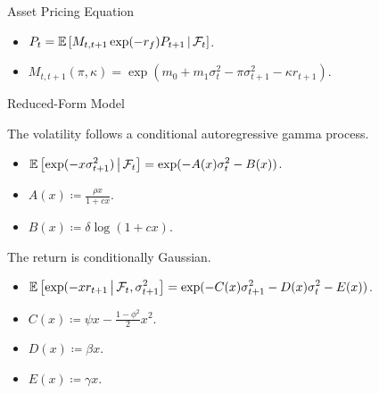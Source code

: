 \documentclass[smaller, aspectratio=169]{beamer}
\begin{document}
\begin{frame}[c]{Asset Pricing Equation}

  \begin{itemize}
    \item $\displaystyle P_t = \mathbb{E}\left[M_{t, t+1} \exp(-r_f) P_{t+1} \,\middle\vert\, \mathcal{F}_{t} \right]$.
      \bigskip
%
    \item $\displaystyle M_{t, t+1}(\pi, \kappa) = \exp\left(m_0 + m_1 \sigma^2_t - \pi \sigma^2_{t+1} - \kappa r_{t+1}\right)$.
  \end{itemize}

\end{frame}


\begin{frame}[c]{Reduced-Form Model}

  The volatility follows a conditional autoregressive gamma process.
%
  \medskip
  \begin{itemize}
    \item $\displaystyle \mathbb{E}\left[\exp(-x \sigma^2_{t+1}) \,\middle\vert\, \mathcal{F}_t\right] = \exp(-A(x) \sigma^2_{t} - B(x)) $.
    \medskip
%
    \item $\displaystyle A(x) \coloneqq \frac{\rho x}{1 + c x}$.
    \medskip
%
    \item $\displaystyle B(x) \coloneqq \delta \log(1 + c x)$.
  \end{itemize}
 
  \bigskip
  The return is conditionally Gaussian.
  \medskip

  \begin{itemize}
    \item $\displaystyle \mathbb{E}\left[\exp(-x r_{t+1} \,\middle\vert\, \mathcal{F}_t, \sigma^2_{t+1} \right] = \exp(-C(x) \sigma^2_{t+1} - D(x) \sigma^2_t - E(x))$.
    \medskip
%
    \item $\displaystyle C(x) \coloneqq \psi x - \frac{1-\phi^2}{2} x^2 $.
    \medskip
%
    \item $\displaystyle D(x) \coloneqq \beta x$.
    \medskip
%
    \item $\displaystyle E(x) \coloneqq \gamma x$. 
%
  \end{itemize}
\end{frame}
\end{document}
